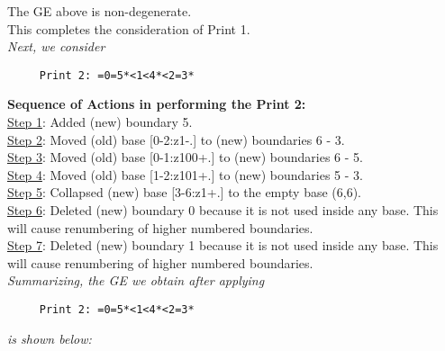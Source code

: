 \documentclass[final]{article}
\begin{document}
The GE above is non-degenerate.\\[0.1in]
This completes the consideration of Print 1.\\[0.1in]
{\em Next, we consider}
\begin{verbatim}
     Print 2: =0=5*<1<4*<2=3*
\end{verbatim}
{\bf Sequence of Actions in performing the Print 2:}\\
{\underline{Step 1}:} Added (new) boundary 5.\\
{\underline{Step 2}:} Moved (old) base [0-2:z1-.]  to (new) boundaries 6 - 3.\\
{\underline{Step 3}:} Moved (old) base [0-1:z100+.]  to (new) boundaries 6 - 5.\\
{\underline{Step 4}:} Moved (old) base [1-2:z101+.]  to (new) boundaries 5 - 3.\\
{\underline{Step 5}:} Collapsed (new) base [3-6:z1+.]  to the empty base (6,6).
\\
{\underline{Step 6}:} Deleted (new) boundary 0 because it is not used inside any base.  This will cause renumbering of higher numbered boundaries.
\\
{\underline{Step 7}:} Deleted (new) boundary 1 because it is not used inside any base.  This will cause renumbering of higher numbered boundaries.
\\[0.1in]
{\em Summarizing, the GE we obtain after applying}
\begin{verbatim}
     Print 2: =0=5*<1<4*<2=3*
\end{verbatim}
{\em is shown below:}
\end{document}
